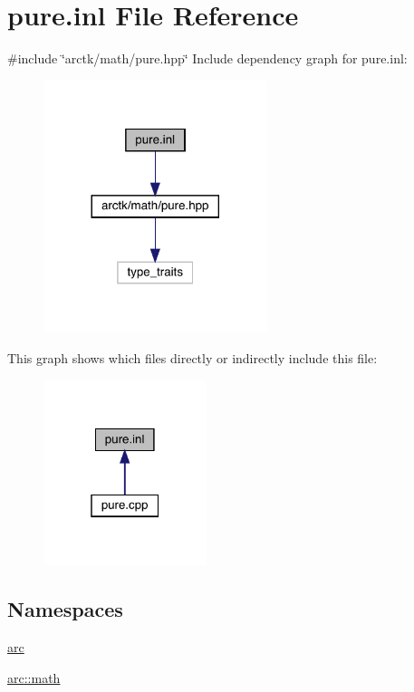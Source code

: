 \hypertarget{pure_8inl}{}\section{pure.\+inl File Reference}
\label{pure_8inl}
{\ttfamily \#include \char`\"{}arctk/math/pure.\+hpp\char`\"{}}\newline
Include dependency graph for pure.\+inl\+:
\nopagebreak
\begin{figure}[H]
\begin{center}
\leavevmode
\includegraphics[width=185pt]{pure_8inl__incl}
\end{center}
\end{figure}
This graph shows which files directly or indirectly include this file\+:
\nopagebreak
\begin{figure}[H]
\begin{center}
\leavevmode
\includegraphics[width=135pt]{pure_8inl__dep__incl}
\end{center}
\end{figure}
\subsection*{Namespaces}
\begin{DoxyCompactItemize}
\item 
 \mbox{\hyperlink{namespacearc}{arc}}
\item 
 \mbox{\hyperlink{namespacearc_1_1math}{arc\+::math}}
\end{DoxyCompactItemize}
